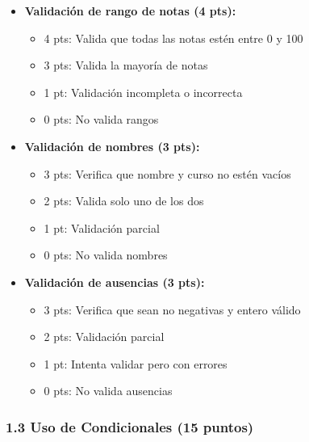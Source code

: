 \documentclass[12pt,a4paper]{article}
\begin{document}
\begin{itemize}[leftmargin=*]
    \item \textbf{Validación de rango de notas (4 pts):}
    \begin{itemize}
        \item 4 pts: Valida que todas las notas estén entre 0 y 100
        \item 3 pts: Valida la mayoría de notas
        \item 1 pt: Validación incompleta o incorrecta
        \item 0 pts: No valida rangos
    \end{itemize}
    
    \item \textbf{Validación de nombres (3 pts):}
    \begin{itemize}
        \item 3 pts: Verifica que nombre y curso no estén vacíos
        \item 2 pts: Valida solo uno de los dos
        \item 1 pt: Validación parcial
        \item 0 pts: No valida nombres
    \end{itemize}
    
    \item \textbf{Validación de ausencias (3 pts):}
    \begin{itemize}
        \item 3 pts: Verifica que sean no negativas y entero válido
        \item 2 pts: Validación parcial
        \item 1 pt: Intenta validar pero con errores
        \item 0 pts: No valida ausencias
    \end{itemize}
\end{itemize}

\subsubsection{1.3 Uso de Condicionales (15 puntos)}
\end{document}
